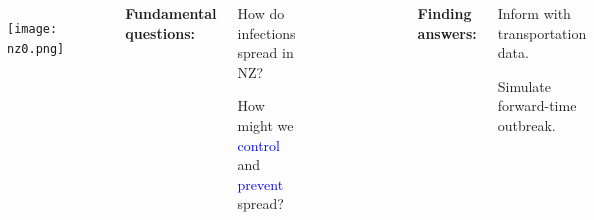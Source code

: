 \documentclass{beamer}
\begin{document}
\begin{frame}

\begin{columns}[c] %


\begin{figure}
\texttt{[image: nz0.png]}
\end{figure}

\vspace{3mm}
\footnotesize{\bf{Fundamental questions:}}
\begin{itemize}
\scriptsize{
\item How do infections spread in NZ?
\item How might we \textcolor{blue}{control} and \textcolor{blue}{prevent} spread?}
\end{itemize}


\begin{figure}
\includegraphics[width=0.75\linewidth]{map.png}
\end{figure}

\footnotesize{\bf{Finding answers:}}
\begin{itemize}
\scriptsize{
\item Inform with transportation data.
\item Simulate forward-time outbreak.}
\end{itemize}
\vspace{3mm}
\end{columns}

\end{frame}
\end{document}
